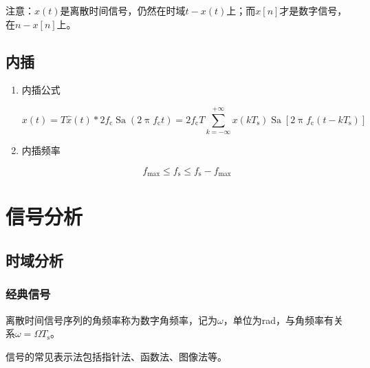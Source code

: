 \documentclass[UTF8,fontset=fandol,zihao=5]{ctexart}
\newcommand{\Sa}{\operatorname{Sa}}
\begin{document}
\begin{methodbox}
  注意：$\hat{x}(t)$是离散时间信号，仍然在时域$t-x(t)$上；而$x[n]$才是数字信号，在$n-x[n]$上。
\end{methodbox}

\subsection{内插}

\begin{enumerate}
  
  \item 内插公式
  
  \[
  x(t) = T\hat{x}(t) \ast 2f_{\mathrm{c}}\Sa(2\uppi f_{\mathrm{c}} t) = 2f_{\mathrm{c}}T\sum_{k=-\infty}^{+\infty} x(kT_{\mathrm{s}}) \Sa \left [ 2\uppi f_{\mathrm{c}}(t-kT_{\mathrm{s}}) \right ]
  \]

  \item 内插频率
  
  \[
  f_{\max} \leq f_{\mathrm{s}} \leq f_{\mathrm{s}}-f_{\max}
  \]

\end{enumerate}

\section{信号分析}

\subsection{时域分析}

\subsubsection{经典信号}

离散时间信号序列的角频率称为数字角频率，记为$\omega$，单位为rad，与角频率有关系$\omega=\varOmega T_{\mathrm{s}}$。

信号的常见表示法包括指针法、函数法、图像法等。
\end{document}

